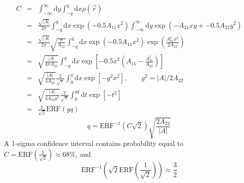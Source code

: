 \documentclass[12pt]{article}
\newcommand{\dee}{\mathrm{d}}
\newcommand{\abs}[1]{\left|#1\right|}
\begin{document}
\begin{eqnarray*}
  C 
  &=& \int_{-\infty}^{\infty}\dee y\int_{-q}^q \dee x \rho(\vec{r})\\
  &=& \frac{\sqrt{\abs{A}}}{2\pi} \int_{-q}^q \dee x \exp\left(-0.5 A_{11}x^2\right) \int_{-\infty}^{\infty}\dee y \exp\left(-A_{21}xy + -0.5A_{22}y^2 \right)\\
  &=& \frac{\sqrt{\abs{A}}}{2\pi} \sqrt{\frac{\pi}{A_{22}}}\int_{-q}^q \dee x \exp\left(-0.5 A_{11}x^2\right) \exp\left(\frac{A_{21}^2x^2}{2A_{22}}\right)\\
  &=& \sqrt{\frac{\abs{A}}{4\pi A_{22}}}\int_{-q}^q \dee x \exp\left[-0.5 x^2\left( A_{11} - \frac{A_{21}^2}{A_{22}}\right)\right]\\
  &=& \sqrt{\frac{\abs{A}}{4 A_{22}}}\frac{2}{\sqrt{\pi}}\int_0^q \dee x \exp\left[- g^2x^2\right],\qquad g^2=\abs{A}/2A_{22} \\
  &=& \sqrt{\frac{\abs{A}}{4 A_{22}g^2}}\frac{2}{\sqrt{\pi}}\int_0^{gq} \dee t \exp\left[- t^2\right]\\
  &=& \frac{1}{\sqrt{2}} \mathrm{ERF}(gq)
\end{eqnarray*}
\begin{equation}
  q = \mathrm{ERF}^{-1}\left(C\sqrt{2}\right)\sqrt{\frac{2A_{22}}{\abs{A}}}
\end{equation}
A 1-sigma confidence interval contains probability equal to
$C=\mathrm{ERF}\left(\frac{1}{\sqrt{2}}\right)\approx 68\%$, and
\[
\mathrm{ERF}^{-1}\left(\sqrt{2}\mathrm{ERF}\left(\frac{1}{\sqrt{2}}\right)\right) \approx \frac{3}{2}
\]
\end{document}
